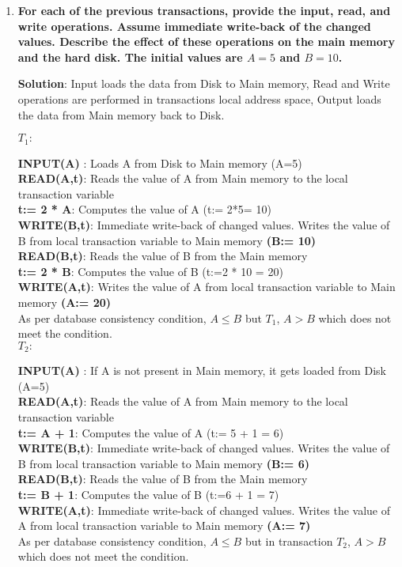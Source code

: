 \begin{enumerate}
\item \textbf{For each of the previous transactions, provide the input, read, and write operations. Assume immediate write-back of the changed values. Describe the effect of these operations on the main memory and the hard disk. The initial values are $A=5$ and $B=10$.}

\textbf{Solution}: Input loads the data from Disk to Main memory, Read and Write operations are performed in transactions local address space, Output loads the data from Main memory back to Disk.

$T_1: $ 

  \textbf{INPUT(A)} : Loads A from Disk to Main memory (A=5)\\
  \textbf{READ(A,t)}: Reads the value of A from Main memory to the local transaction variable \\
  \textbf{t:= 2 * A}: Computes the value of A (t:= 2*5= 10)\\
  \textbf{WRITE(B,t)}: Immediate write-back of changed values. Writes the value of B from local transaction variable to Main memory \textbf{(B:= 10)}\\
  \textbf{READ(B,t)}: Reads the value of B from the Main memory \\
  \textbf{t:= 2 * B}: Computes the value of B (t:=2 * 10 = 20)\\
  \textbf{WRITE(A,t)}: Writes the value of A from local transaction variable to Main memory \textbf{(A:= 20)}\\
  As per database consistency condition, $A \leq B$ but $T_1$, $A > B$ which does not meet the condition.\\
 
$T_2: $ 

  \textbf{INPUT(A)} : If A is not present in Main memory, it gets loaded from Disk (A=5)\\
  \textbf{READ(A,t)}: Reads the value of A from Main memory to the local transaction variable \\
  \textbf{t:= A + 1}: Computes the value of A (t:= 5 + 1 = 6)\\
  \textbf{WRITE(B,t)}: Immediate write-back of changed values. Writes the value of B from local transaction variable to Main memory \textbf{(B:= 6)}\\
  \textbf{READ(B,t)}: Reads the value of B from the Main memory\\
  \textbf{t:= B + 1}: Computes the value of B (t:=6 + 1 = 7)\\
  \textbf{WRITE(A,t)}: Immediate write-back of changed values. Writes the value of A from local transaction variable to Main memory \textbf{(A:= 7)}\\
  As per database consistency condition, $A \leq B$ but in transaction $T_2$, $A > B$ which does not meet the condition.\\


\end{enumerate}
